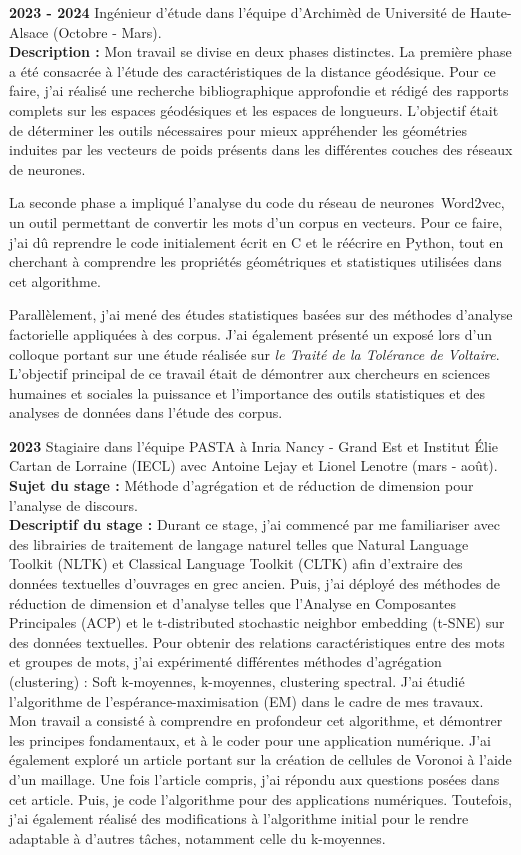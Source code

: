 \documentclass[11pt]{article}
\begin{document}
	
	
	\textbf{2023 - 2024} Ingénieur d'étude dans l'équipe d'Archimèd de Université de Haute-Alsace (Octobre - Mars).\\
	\textbf{Description : } Mon travail se divise en deux phases distinctes. La première phase a été consacrée à l’étude des caractéristiques de la distance géodésique. Pour ce faire, j’ai réalisé une recherche bibliographique approfondie et rédigé des rapports complets sur les espaces géodésiques et les espaces de longueurs. L’objectif était de déterminer les outils nécessaires pour mieux appréhender les géométries induites par les vecteurs de poids présents dans les différentes couches des réseaux de neurones.
	
	La seconde phase a impliqué l’analyse du code du réseau de neurones Word2vec, un outil permettant de convertir les mots d’un corpus en vecteurs. Pour ce faire, j’ai dû reprendre le code initialement écrit en C et le réécrire en Python, tout en cherchant à comprendre les propriétés géométriques et statistiques utilisées dans cet algorithme. 
	
	Parallèlement, j’ai mené des études statistiques basées sur des méthodes d’analyse factorielle appliquées à des corpus. J’ai également présenté un exposé lors d’un colloque portant sur une étude réalisée sur \textit{le Traité de la Tolérance de Voltaire}. L’objectif principal de ce travail était de démontrer aux chercheurs en sciences humaines et sociales la puissance et l’importance des outils statistiques et des analyses de données dans l’étude des corpus.  
	
	\textbf{2023} Stagiaire dans l'équipe PASTA à Inria Nancy - Grand Est  et Institut Élie Cartan de Lorraine (IECL) avec Antoine Lejay et Lionel Lenotre (mars - août).  \\
	\textbf{Sujet du stage : } Méthode d'agrégation et de réduction de dimension pour l'analyse de discours. \\
	\textbf{Descriptif du stage : } Durant ce stage,  j'ai commencé par me familiariser avec des librairies de traitement de langage naturel telles que Natural Language Toolkit (NLTK) et Classical Language Toolkit (CLTK) afin d'extraire des données textuelles d'ouvrages en grec ancien. Puis, j'ai déployé des méthodes de réduction de dimension et d'analyse telles que l'Analyse en Composantes Principales (ACP) et le t-distributed stochastic neighbor embedding (t-SNE) sur des données textuelles. Pour obtenir des relations caractéristiques entre des mots et groupes de mots, j'ai expérimenté différentes méthodes d'agrégation (clustering) : Soft k-moyennes, k-moyennes, clustering spectral. J'ai étudié l'algorithme de l'espérance-maximisation (EM) dans le cadre de mes travaux. Mon travail a consisté à comprendre en profondeur cet algorithme, et démontrer les principes fondamentaux, et à le coder pour une application numérique. J'ai également exploré un article portant sur la création de cellules de Voronoi à l'aide d'un maillage. Une fois l'article compris, j'ai répondu aux questions posées dans cet article. Puis, je code l'algorithme pour des applications numériques. Toutefois, j'ai également réalisé des modifications à l'algorithme initial pour le rendre adaptable à d'autres tâches, notamment celle du k-moyennes.
	
\end{document}

